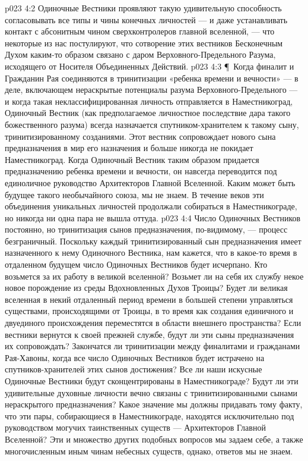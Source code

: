\vs p023 4:2 Одиночные Вестники проявляют такую удивительную способность согласовывать все типы и чины конечных личностей --- и даже устанавливать контакт с абсонитным чином сверхконтролеров главной вселенной, --- что некоторые из нас постулируют, что сотворение этих вестников Бесконечным Духом каким\hyp{}то образом связано с даром Верховного\hyp{}Предельного Разума, исходящего от Носителя Объединенных Действий.
\vs p023 4:3 \P\ Когда финалит и Гражданин Рая соединяются в тринитизации «ребенка времени и вечности» --- в деле, включающем нераскрытые потенциалы разума Верховного\hyp{}Предельного --- и когда такая неклассифицированная личность отправляется в Наместникоград, Одиночный Вестник (как предполагаемое личностное последствие дара такого божественного разума) всегда назначается спутником\hyp{}хранителем к такому сыну, тринитизированному созданиями. Этот вестник сопровождает нового сына предназначения в мир его назначения и больше никогда не покидает Наместникоград. Когда Одиночный Вестник таким образом придается предназначению ребенка времени и вечности, он навсегда переводится под единоличное руководство Архитекторов Главной Вселенной. Каким может быть будущее такого необычайного союза, мы не знаем. В течение веков эти объединения уникальных личностей продолжали собираться в Наместникограде, но никогда ни одна пара не вышла оттуда.
\vs p023 4:4 Число Одиночных Вестников постоянно, но тринитизация сынов предназначения, по\hyp{}видимому, --- процесс безграничный. Поскольку каждый тринитизированный сын предназначения имеет назначенного к нему Одиночного Вестника, нам кажется, что в какое\hyp{}то время в отдаленном будущем число Одиночных Вестников будет исчерпано. Кто возьмется за их работу в великой вселенной? Возьмет ли на себя их службу некое новое порождение из среды Вдохновленных Духов Троицы? Будет ли великая вселенная в некий отдаленный период времени в большей степени управляться существами, происходящими от Троицы, в то время как создания единичного и двуединого происхождения переместятся в области внешнего пространства? Если вестники вернутся к своей прежней службе, будут ли эти сыны предназначения их сопровождать? Закончатся ли тринитизации между финалитами и гражданами Рая\hyp{}Хавоны, когда все число Одиночных Вестников будет истрачено на спутников\hyp{}хранителей этих сынов достижения? Все ли наши искусные Одиночные Вестники будут сконцентрированы в Наместникограде? Будут ли эти удивительные духовные личности вечно связаны с тринитизированными сынами нераскрытого предназначения? Какое значение мы должны придавать тому факту, что эти пары, собирающиеся в Наместникограде, находятся исключительно под руководством могучих таинственных существ --- Архитекторов Главной Вселенной? Эти и множество других подобных вопросов мы задаем себе, а также многочисленным иным чинам небесных существ, однако, ответов мы не знаем.
